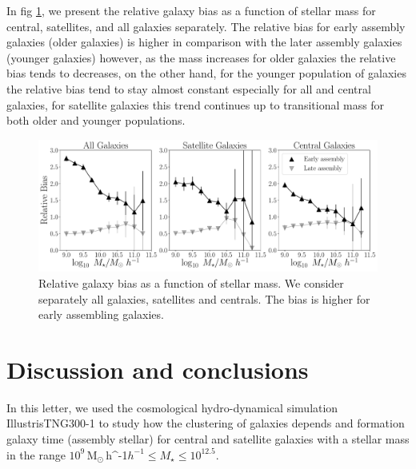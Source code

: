 \documentclass[fleqn,usenatbib]{mnras}
\newcommand{\Msunh}{\,{\rm M}$_{\odot}$\,\ifmmode h^{-1}\else $h^{-1}$\fi}
\begin{document}
In fig \ref{fig:galaxy_bias}, we present the relative galaxy bias as a
function of stellar mass for central, satellites, and all galaxies
separately. The relative bias for early assembly galaxies (older
galaxies) is higher in comparison with the later assembly galaxies
(younger galaxies) however, as the mass increases for older galaxies
the relative bias tends to decreases, on the other hand, for the
younger population of galaxies the relative bias tend to stay almost
constant especially for all and central galaxies, for satellite
galaxies this trend continues up to transitional mass for both older
and younger populations. 

\begin{figure}
    \centering
    \includegraphics[width=2.0\columnwidth]{figuras/bias_galaxies.pdf}
    \caption{Relative galaxy bias as a function of stellar mass.
    We consider separately all galaxies, satellites and centrals.
    The bias is higher for early assembling galaxies.}
    \label{fig:galaxy_bias}
\end{figure}

\section{Discussion and conclusions}
\label{sec:conclu}
In this letter, we used the cosmological hydro-dynamical simulation IllustrisTNG300-1 to study how the clustering of galaxies depends and formation galaxy time (assembly stellar) for central and satellite galaxies with a stellar mass in the range $10^{9}$\Msunh $\leq M_{\star} \leq 10^{12.5}$.
\end{document}
